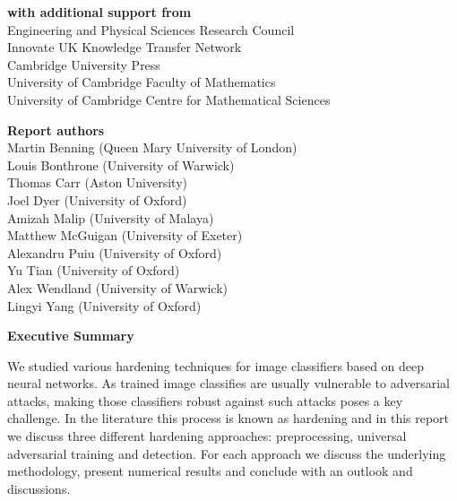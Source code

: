 \documentclass[12pt]{article}
\begin{document}
\begin{center}
\textbf{with additional support from}\\
Engineering and Physical Sciences Research Council\\
Innovate UK Knowledge Transfer Network\\
Cambridge University Press\\
University of Cambridge Faculty of Mathematics\\
University of Cambridge Centre for Mathematical Sciences
\end{center}
\newpage
\begin{center}
    \large\textbf{Report authors}\\ %
   \vskip1cm
    \normalsize Martin Benning (Queen Mary University of London) \\
    \normalsize Louis Bonthrone (University of Warwick)\\
    \normalsize Thomas Carr (Aston University)\\
    \normalsize Joel Dyer (University of Oxford)\\
    \normalsize Amizah Malip (University of Malaya)\\
    \normalsize Matthew McGuigan (University of Exeter)\\
    \normalsize Alexandru Puiu (University of Oxford)\\
    \normalsize Yu Tian (University of Oxford)\\
    \normalsize Alex Wendland (University of Warwick)\\
    \normalsize Lingyi Yang (University of Oxford)
\end{center}
\vskip2cm
\begin{center}
    \textbf{Executive Summary}
\end{center}
We studied various hardening techniques for image classifiers based on deep neural networks. As trained image classifies are usually vulnerable to adversarial attacks, making those classifiers robust against such attacks poses a key challenge. In the literature this process is known as hardening and in this report we discuss three different hardening approaches: preprocessing, universal adversarial training and detection. For each approach we discuss the underlying methodology, present numerical results and conclude with an outlook and discussions.
\end{document}

